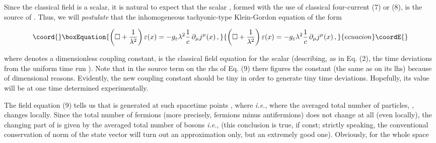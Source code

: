 \documentclass[a4paper,12pt]{article}
\begin{document}
Since the classical field \coordHE{} is a scalar, it is natural to expect that the scalar \coordHE{}, formed with the use of classical four-current (7) or (8), is the source of \coordHE{}. Thus, we will {\it postulate} that the inhomogeneous tachyonic-type Klein-Gordon equation of the form

\begin{equation}\coord{}\boxEquation{
\left( \Box + \frac{1}{\lambda^2}\right) \varepsilon (x) = -g_\varepsilon \lambda ^2 \frac{1}{c} \, \partial_\mu j^\mu (x) \,,
}{
\left( \Box + \frac{1}{\lambda^2}\right) \varepsilon (x) = -g_\varepsilon \lambda ^2 \frac{1}{c} \, \partial_\mu j^\mu (x) \,,
}{ecuacion}\coordE{}\end{equation}

\ni where \coordHE{} denotes a dimensionless coupling constant, is the classical field equation for the scalar \coordHE{} (describing, as in Eq. (2), the time deviations \coordHE{} from the uniform time run \coordHE{}). Note that in the source term on the rhs of Eq. (9) there figures  the constant \coordHE{} (the same as on its lhs) because of dimensional reasons. Evidently, the new coupling constant \coordHE{} should be tiny in order to generate tiny time deviations. Hopefully, its value will be at one time determined experimentally.

The field equation (9) tells us that \coordHE{} is generated at such spacetime points \coordHE{}, where
\coordHE{} {\it i.e.}, where the averaged total number of particles, \coordHE{}, changes locally. Since the total number of fermions (more precisely, fermions minus antifermions) does not change at all (even locally), the changing part of \coordHE{} is given by the averaged total number of bosons {\it i.e.}, \coordHE{} (this conclusion is true, if \coordHE{} const; strictly speaking, the conventional conservation of norm of the state vector will turn out an approximation only, but an extremely good one). Obviously, for the whole space
\end{document}
